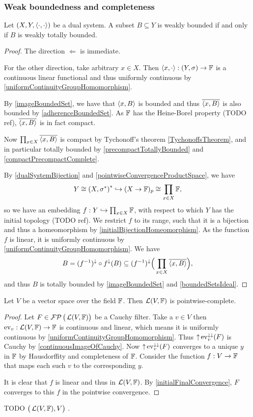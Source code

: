 \subsubsection{Weak boundedness and completeness}
\begin{proposition} \label{weakBoundedness}
Let $\left( X,Y,\left\langle \cdot,\cdot \right\rangle \right)$ be a dual system. A subset $B\subseteq Y$ is weakly bounded \textup{if and only if} $B$ is weakly totally bounded.
\end{proposition}
\begin{proof}
The direction $\Leftarrow$ is immediate.

For the other direction, take arbitrary $x\in X$. Then $\left\langle x,\cdot \right\rangle: \left( Y,\sigma \right)\to \mathbb{F}$ is a continuous linear functional and thus uniformly continuous by \ref{uniformContinuityGroupHomomorphism}. 

By \ref{imageBoundedSet}, we have that $\left\langle x, B \right\rangle$ is bounded and thus $\overline{\left\langle x,B \right\rangle}$ is also bounded by \ref{adherenceBoundedSet}. As $\mathbb{F}$ has the Heine-Borel property (TODO ref), $\overline{\left\langle x,B \right\rangle}$ is in fact compact.

Now $\prod_{x\in X}\overline{\left\langle x, B \right\rangle}$ is compact by Tychonoff's theorem \ref{TychonoffsTheorem}, and in particular totally bounded by \ref{precompactTotallyBounded} and \ref{compactPrecompactComplete}.

By \ref{dualSystemBijection} and \ref{pointwiseConvergenceProductSpace}, we have
\[ Y \cong \left( X,\sigma^* \right)^* \hookrightarrow (X\to \mathbb{F})_p \cong \prod_{x\in X}\mathbb{F}, \]
so we have an embedding $f: Y \hookrightarrow \prod_{x\in X}\mathbb{F}$, with respect to which $Y$ has the initial topology (TODO ref). We restrict $f$ to its range, such that it is a bijection and thus a homeomorphism by \ref{initialBijectionHomeomorphism}. As the function $f$ is linear, it is uniformly continuous by \ref{uniformContinuityGroupHomomorphism}.
We have
\[ B = (f^{-1})^\downarrow\circ f^\downarrow(B) \subseteq (f^{-1})^\downarrow\Big(\prod_{x\in X}\overline{\left\langle x, B \right\rangle}\Big), \]
and thus $B$ is totally bounded by \ref{imageBoundedSet} and \ref{boundedSetsIdeal}.
\end{proof}

\begin{proposition} \label{algebraicDualComplete}
Let $V$ be a vector space over the field $\mathbb{F}$. Then $\operatorname{\mathcal{L}}(V,\mathbb{F})$ is pointwise-complete.
\end{proposition}
\begin{proof}
Let $F\in\operatorname{\mathcal{FP}}\big(\operatorname{\mathcal{L}}(V,\mathbb{F})\big)$ be a Cauchy filter. Take a $v\in V$ then $\operatorname{ev}_v: \operatorname{\mathcal{L}}(V,\mathbb{F})\to \mathbb{F}$ is continuous and linear, which means it is uniformly continuous by \ref{uniformContinuityGroupHomomorphism}. Thus $\operatorname{\uparrow}\operatorname{ev}_v^{\downarrow\downarrow}(F)$ is Cauchy by \ref{continuousImageOfCauchy}. Now $\operatorname{\uparrow}\operatorname{ev}_v^{\downarrow\downarrow}(F)$ converges to a unique $y$ in $\mathbb{F}$ by Hausdorffity and completeness of $\mathbb{F}$. Consider the function $f: V\to \mathbb{F}$ that maps each such $v$ to the corresponding $y$.

It is clear that $f$ is linear and thus in $\operatorname{\mathcal{L}}(V,\mathbb{F})$. By \ref{initialFinalConvergence}, $F$ converges to this $f$ in the pointwise convergence.
\end{proof}
TODO $\big(\operatorname{\mathcal{L}}(V,\mathbb{F}),V\big)$ .

